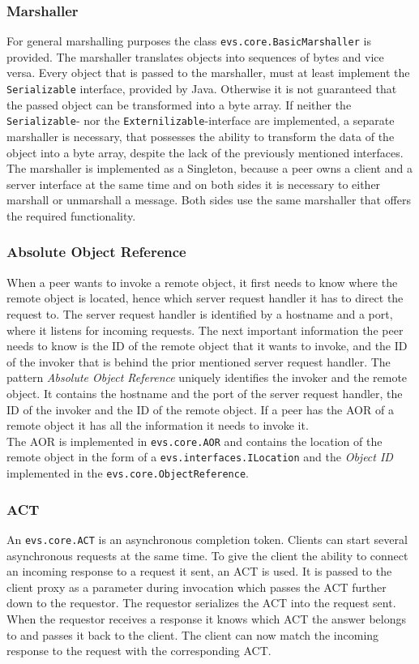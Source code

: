 \subsubsection{Marshaller}
For general marshalling purposes the class \texttt{evs.core.BasicMarshaller} is provided. The marshaller translates objects into sequences of bytes and vice versa. Every object that is passed to the marshaller, must at least implement the \texttt{Serializable} interface, provided by Java. Otherwise it is not guaranteed that the passed object can be transformed into a byte array. If neither the \texttt{Serializable}- nor the \texttt{Externilizable}-interface are implemented, a separate marshaller is necessary, that possesses the ability to transform the data of the object into a byte array, despite the lack of the previously mentioned interfaces. The marshaller is implemented as a Singleton, because a peer owns a client and a server interface at the same time and on both sides it is necessary to either marshall or unmarshall a message. Both sides use the same marshaller that offers the required functionality.

\subsubsection{Absolute Object Reference}
When a peer wants to invoke a remote object, it first needs to know where the remote object is located, hence which server request handler it has to direct the request to. The server request handler is identified by a hostname and a port, where it listens for incoming requests. The next important information the peer needs to know is the ID of the remote object that it wants to invoke, and the ID of the invoker that is behind the prior mentioned server request handler. The pattern \textit{Absolute Object Reference} uniquely identifies the invoker and the remote object. It contains the hostname and the port of the server request handler, the ID of the invoker and the ID of the remote object. If a peer has the AOR of a remote object it has all the information it needs to invoke it. \\
The AOR is implemented in \texttt{evs.core.AOR} and contains the location of the remote object in the form of a \texttt{evs.interfaces.ILocation} and the \textit{Object ID} implemented in the \texttt{evs.core.ObjectReference}.

\subsubsection{ACT}
An \texttt{evs.core.ACT} is an asynchronous completion token. Clients can start several asynchronous requests at the same time. To give the client the ability to connect an incoming response to a request it sent, an ACT is used. It is passed to the client proxy as a parameter during invocation which passes the ACT further down to the requestor. The requestor serializes the ACT into the request sent. When the requestor receives a response it knows which ACT the answer belongs to and passes it back to the client. The client can now match the incoming response to the request with the corresponding ACT. 

